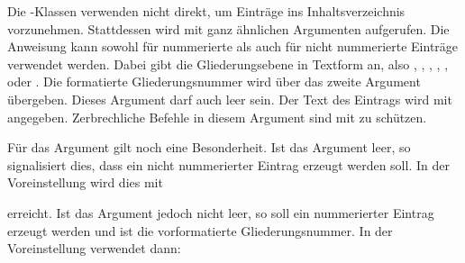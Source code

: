 \begin{Declaration}
\end{Declaration}
Die \KOMAScript-Klassen verwenden
%
 nicht direkt, um Einträge ins
Inhaltsverzeichnis vorzunehmen. Stattdessen wird 
mit ganz ähnlichen Argumenten aufgerufen. Die Anweisung kann sowohl für
nummerierte als auch für nicht nummerierte Einträge verwendet werden. Dabei
gibt  die Gliederungsebene in Textform an, also ,
, , ,
,  oder . Die
formatierte Gliederungsnummer wird über das zweite Argument 
übergeben. Dieses Argument darf auch leer sein. Der Text des Eintrags wird mit
 angegeben. Zerbrechliche Befehle in
diesem Argument sind mit
 zu schützen.

Für das Argument  gilt noch eine Besonderheit. Ist das Argument
leer, so signalisiert dies, dass ein nicht nummerierter Eintrag erzeugt werden
soll. In der Voreinstellung wird dies mit
\begin{quote}\small\raggedright
\end{quote}
erreicht. Ist das Argument jedoch nicht leer, so soll ein nummerierter Eintrag
erzeugt werden und  ist die vorformatierte Gliederungsnummer. In
der Voreinstellung verwendet \KOMAScript{} dann:
\begin{quote}\small\raggedright
\end{quote}

